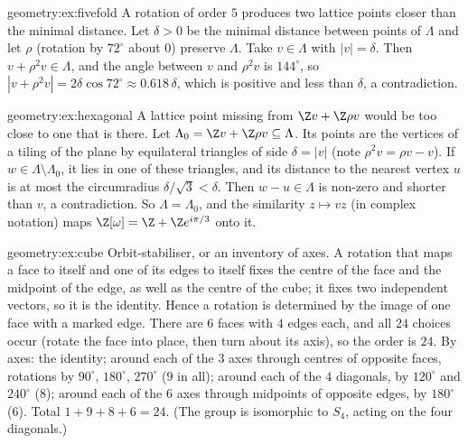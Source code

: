 \begin{solution}{geometry:ex:fivefold}
\idea A rotation of order $5$ produces two lattice points closer than the minimal distance.
\writeup Let $\delta>0$ be the minimal distance between points of $\Lambda$ and let $\rho$ (rotation by $72^\circ$ about $0$) preserve $\Lambda$.
Take $v\in\Lambda$ with $|v|=\delta$. Then $v+\rho^2v\in\Lambda$, and the angle between $v$ and $\rho^2v$ is $144^\circ$, so
$|v+\rho^2v|=2\delta\cos72^\circ\approx0.618\,\delta$, which is positive and less than $\delta$, a contradiction.
\end{solution}

\begin{solution}{geometry:ex:hexagonal}
\idea A lattice point missing from $\Z v+\Z\rho v$ would be too close to one that is there.
\writeup Let $\Lambda_0=\Z v+\Z\rho v\subseteq\Lambda$. Its points are the vertices of a tiling of the plane by equilateral triangles of side
$\delta=|v|$ (note $\rho^2v=\rho v-v$). If $w\in\Lambda\setminus\Lambda_0$, it lies in one of these triangles, and its distance to the
nearest vertex $u$ is at most the circumradius $\delta/\sqrt3<\delta$. Then $w-u\in\Lambda$ is non-zero and shorter than $v$, a contradiction.
So $\Lambda=\Lambda_0$, and the similarity $z\mapsto vz$ (in complex notation) maps $\Z[\omega]=\Z+\Z e^{i\pi/3}$ onto it.
\end{solution}

\begin{solution}{geometry:ex:cube}
\idea Orbit-stabiliser, or an inventory of axes.
\writeup A rotation that maps a face to itself and one of its edges to itself fixes the centre of the face and the midpoint of the edge,
as well as the centre of the cube; it fixes two independent vectors, so it is the identity. Hence a rotation is determined by the
image of one face with a marked edge. There are $6$ faces with $4$ edges each, and all $24$ choices occur (rotate the face into place,
then turn about its axis), so the order is $24$. By axes: the identity; around each of the $3$
axes through centres of opposite faces, rotations by $90^\circ$, $180^\circ$, $270^\circ$ ($9$ in all); around each of the $4$ diagonals, by
$120^\circ$ and $240^\circ$ ($8$); around each of the $6$ axes through midpoints of opposite edges, by $180^\circ$ ($6$). Total
$1+9+8+6=24$. (The group is isomorphic to $S_4$, acting on the four diagonals.)
\end{solution}

